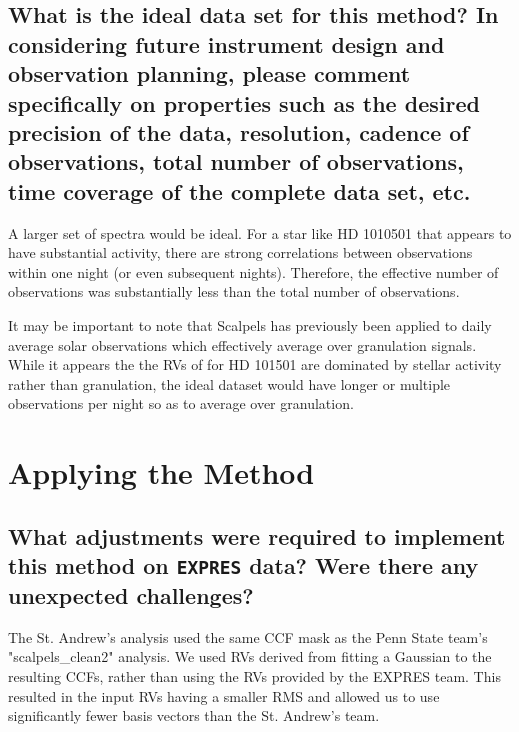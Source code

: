 \documentclass[12pt]{article}
\begin{document}
\subsection{What is the ideal data set for this method?  In considering future instrument design and observation planning, please comment specifically on properties such as the desired precision of the data, resolution, cadence of observations, total number of observations, time coverage of the complete data set, etc.}

A larger set of spectra would be ideal.  For a star like HD 1010501 that appears to have substantial activity, there are strong correlations between observations within one night (or even subsequent nights).  Therefore, the effective number of observations was substantially less than the total number of observations.

It may be important to note that Scalpels has previously been applied to daily average solar observations which effectively average over granulation signals.  While it appears the the RVs of for HD 101501 are dominated by stellar activity rather than granulation, the ideal dataset would have longer or multiple observations per night so as to average over granulation.





\section{Applying the Method}
\subsection{What adjustments were required to implement this method on \texttt{EXPRES} data?  Were there any unexpected challenges?}

The St. Andrew's analysis used the same CCF mask as the Penn State team's "scalpels_clean2" analysis.
We used RVs derived from fitting a Gaussian to the resulting CCFs, rather than using the RVs provided by the EXPRES team.  This resulted in the input RVs having a smaller RMS and allowed us to use significantly fewer basis vectors than the St. Andrew's team.  
\end{document}
